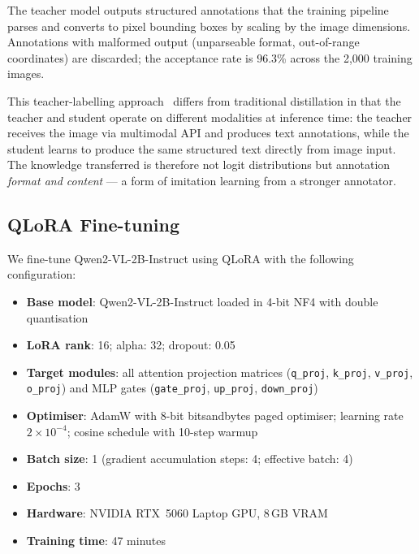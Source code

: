 \documentclass[conference]{IEEEtran}
\begin{document}
The teacher model outputs structured annotations
that the training pipeline parses and converts to
pixel bounding boxes by scaling by the image
dimensions.
Annotations with malformed output (unparseable
format, out-of-range coordinates) are discarded;
the acceptance rate is 96.3\% across the 2,000
training images.

This teacher-labelling approach~\cite{taori2023alpaca}
differs from traditional distillation in that the
teacher and student operate on different modalities
at inference time: the teacher receives the image
via multimodal API and produces text annotations,
while the student learns to produce the same
structured text directly from image input.
The knowledge transferred is therefore not logit
distributions but annotation \emph{format and
content} --- a form of imitation learning
from a stronger annotator.

\subsection{QLoRA Fine-tuning}

We fine-tune Qwen2-VL-2B-Instruct using QLoRA
with the following configuration:

\begin{itemize}
  \item \textbf{Base model}: Qwen2-VL-2B-Instruct
        loaded in 4-bit NF4 with double
        quantisation~\cite{dettmers2023qlora}
  \item \textbf{LoRA rank}: 16; alpha: 32;
        dropout: 0.05
  \item \textbf{Target modules}: all attention
        projection matrices
        (\texttt{q\_proj}, \texttt{k\_proj},
        \texttt{v\_proj}, \texttt{o\_proj})
        and MLP gates
        (\texttt{gate\_proj}, \texttt{up\_proj},
        \texttt{down\_proj})
  \item \textbf{Optimiser}: AdamW with 8-bit
        bitsandbytes paged optimiser;
        learning rate $2 \times 10^{-4}$;
        cosine schedule with 10-step warmup
  \item \textbf{Batch size}: 1 (gradient
        accumulation steps: 4; effective batch: 4)
  \item \textbf{Epochs}: 3
  \item \textbf{Hardware}: NVIDIA RTX~5060
        Laptop GPU, 8\,GB VRAM
  \item \textbf{Training time}: 47 minutes
\end{itemize}
\end{document}
